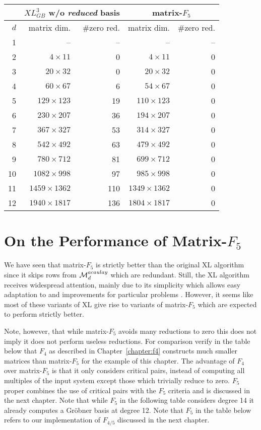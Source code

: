 \begin{center}
\begin{tabular}{|r|r|r|r|r|}
\hline
& \multicolumn{2}{|c|}{$XL_{GB}^{3}$ w/o \emph{reduced} basis} & \multicolumn{2}{|c|}{matrix-$F_5$}\\
\hline
$d$ & matrix dim. & \#zero red.& matrix dim. & \#zero red.\\
\hline
   1&               --&  --&                --&--\\
   2&$   4\times   11$&   0&$   4\times   11$ &0\\
   3&$  20\times   32$&   0&$  20\times   32$ &0\\
   4&$  60\times   67$&   6&$  54\times   67$ &0\\
   5&$ 129\times  123$&  19&$ 110\times  123$ &0\\
   6&$ 230\times  207$&  36&$ 194\times  207$ &0\\
   7&$ 367\times  327$&  53&$ 314\times  327$ &0\\
   8&$ 542\times  492$&  63&$ 479\times  492$ &0\\
   9&$ 780\times  712$&  81&$ 699\times  712$ &0\\
  10&$1082\times  998$&  97&$ 985\times  998$ &0\\
  11&$1459\times 1362$& 110&$1349\times 1362$ &0\\
  12&$1940\times 1817$& 136&$1804\times 1817$ &0\\
\hline
\end{tabular}
\end{center}


\section{On the Performance of Matrix-\texorpdfstring{$F_5$}{F5}}
We have seen that matrix-$F_5$ is strictly better than the original XL algorithm since it skips rows from $\mathcal{M}^{acaulay}_{d}$ which are redundant. Still, the XL algorithm receives widespread attention, mainly due to its simplicity which allows easy adaptation to and improvements for particular problems \cite{courtois-patarin:ct-rsa03,murphy-paterson:jmc2008,antiquad,mxl2}. However, it seems like most of these variants of XL give rise to variants of matrix-$F_5$ which are expected to perform strictly better.

Note, however, that while matrix-$F_5$ avoids many reductions to zero this does not imply it does not perform useless reductions. For comparison verify in the table below that $F_4$ as described in Chapter~\ref{chapter:f4} constructs much smaller matrices than matrix-$F_5$ for the example of this chapter. The advantage of $F_4$ over matrix-$F_5$ is that it only considers critical pairs, instead of computing all multiples of the input system except those which trivially reduce to zero. $F_5$ proper combines the use of critical pairs with the $F_5$ criteria and is discussed in the next chapter. Note that while $F_5$ in the following table considers degree 14 it already computes a Gröbner basis at degree 12. Note that $F_{5}$ in the table below refers to our implementation of $F_{4/5}$ discussed in the next chapter.

